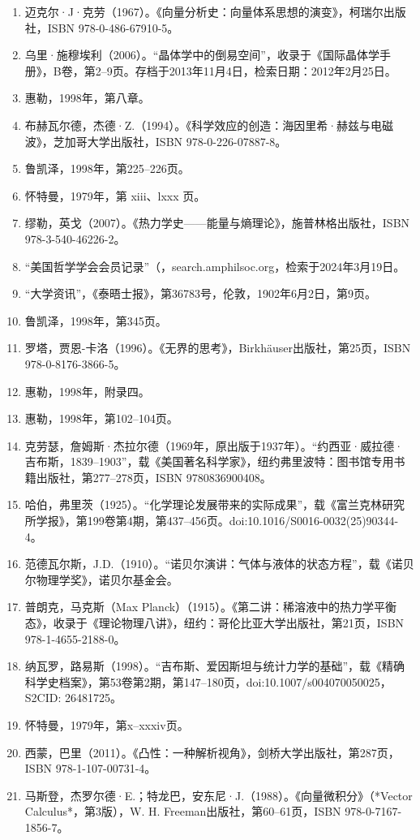 \begin{enumerate}
\item 迈克尔·J·克劳（1967）。《向量分析史：向量体系思想的演变》，柯瑞尔出版社，ISBN 978-0-486-67910-5。
\item 乌里·施穆埃利（2006）。“晶体学中的倒易空间”，收录于《国际晶体学手册》，B卷，第2–9页。存档于2013年11月4日，检索日期：2012年2月25日。
\item 惠勒，1998年，第八章。
\item 布赫瓦尔德，杰德·Z.（1994）。《科学效应的创造：海因里希·赫兹与电磁波》，芝加哥大学出版社，ISBN 978-0-226-07887-8。
\item 鲁凯泽，1998年，第225–226页。
\item 怀特曼，1979年，第 xiii、lxxx 页。
\item 缪勒，英戈（2007）。《热力学史——能量与熵理论》，施普林格出版社，ISBN 978-3-540-46226-2。
\item “美国哲学学会会员记录”（，search.amphilsoc.org，检索于2024年3月19日。
\item “大学资讯”，《泰晤士报》，第36783号，伦敦，1902年6月2日，第9页。
\item 鲁凯泽，1998年，第345页。
\item 罗塔，贾恩-卡洛（1996）。《无界的思考》，Birkhäuser出版社，第25页，ISBN 978-0-8176-3866-5。
\item 惠勒，1998年，附录四。
\item 惠勒，1998年，第102–104页。
\item 克劳瑟，詹姆斯·杰拉尔德（1969年，原出版于1937年）。“约西亚·威拉德·吉布斯，1839–1903”，载《美国著名科学家》，纽约弗里波特：图书馆专用书籍出版社，第277–278页，ISBN 9780836900408。
\item 哈伯，弗里茨（1925）。“化学理论发展带来的实际成果”，载《富兰克林研究所学报》，第199卷第4期，第437–456页。doi:10.1016/S0016-0032(25)90344-4。
\item 范德瓦尔斯，J.D.（1910）。“诺贝尔演讲：气体与液体的状态方程”，载《诺贝尔物理学奖》，诺贝尔基金会。
\item 普朗克，马克斯（Max Planck）（1915）。《第二讲：稀溶液中的热力学平衡态》，收录于《理论物理八讲》，纽约：哥伦比亚大学出版社，第21页，ISBN 978-1-4655-2188-0。
\item 纳瓦罗，路易斯（1998）。“吉布斯、爱因斯坦与统计力学的基础”，载《精确科学史档案》，第53卷第2期，第147–180页，doi:10.1007/s004070050025，S2CID: 26481725。
\item 怀特曼，1979年，第x–xxxiv页。
\item 西蒙，巴里（2011）。《凸性：一种解析视角》，剑桥大学出版社，第287页，ISBN 978-1-107-00731-4。
\item 马斯登，杰罗尔德·E.；特龙巴，安东尼·J.（1988）。《向量微积分》（*Vector Calculus*，第3版），W. H. Freeman出版社，第60–61页，ISBN 978-0-7167-1856-7。

\end{enumerate}
